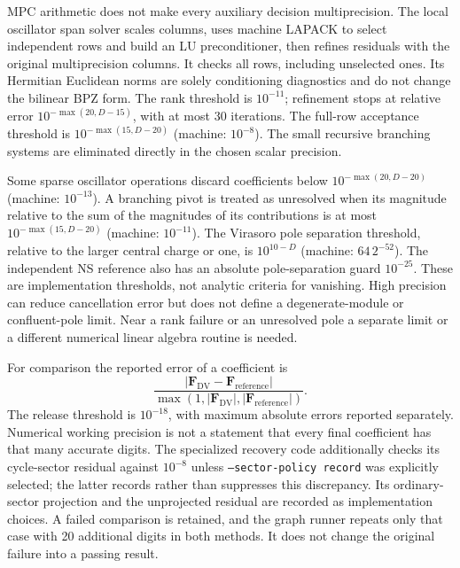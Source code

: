 MPC arithmetic does not make every auxiliary decision multiprecision.
The local oscillator span solver scales columns, uses machine LAPACK
to select independent rows and build an LU preconditioner, then refines
residuals with the original multiprecision columns. It checks all rows,
including unselected ones. Its Hermitian Euclidean norms are solely
conditioning diagnostics and do not change the bilinear BPZ form.
The rank threshold is $10^{-11}$; refinement stops at relative error
$10^{-\max(20,D-15)}$, with at most 30 iterations. The full-row
acceptance threshold is $10^{-\max(15,D-20)}$ (machine: $10^{-8}$).
The small recursive branching systems are eliminated directly in the
chosen scalar precision.

Some sparse oscillator operations discard coefficients below
$10^{-\max(20,D-20)}$ (machine: $10^{-13}$). A branching pivot is
treated as unresolved when its magnitude relative to the sum of the
magnitudes of its contributions is at most
$10^{-\max(15,D-20)}$ (machine: $10^{-11}$). The Virasoro pole
separation threshold, relative to the larger central charge or one,
is $10^{10-D}$ (machine: $64\,2^{-52}$). The independent NS reference
also has an absolute pole-separation guard $10^{-25}$.
These are implementation thresholds, not analytic criteria for
vanishing. High precision can reduce cancellation error but does not
define a degenerate-module or confluent-pole limit. Near a rank failure
or an unresolved pole a separate limit or a different numerical
linear algebra routine is needed.

For comparison the reported error of a coefficient is
\begin{equation}
 \frac{|\mathbf F_{\mathrm{DV}}-\mathbf F_{\mathrm{reference}}|}
 {\max(1,|\mathbf F_{\mathrm{DV}}|,|\mathbf F_{\mathrm{reference}}|)}.
 \label{eq:app-error}
\end{equation}
The release threshold is $10^{-18}$, with maximum absolute errors
reported separately. Numerical working precision is not a statement
that every final coefficient has that many accurate digits. The
specialized recovery code additionally checks its cycle-sector residual
against $10^{-8}$ unless \texttt{--sector-policy record} was explicitly
selected; the latter records rather than suppresses this discrepancy.
Its ordinary-sector projection and the unprojected residual are recorded
as implementation choices. A failed comparison is retained, and the
graph runner repeats only that case with 20 additional digits in both
methods. It does not change the original failure into a passing result.


